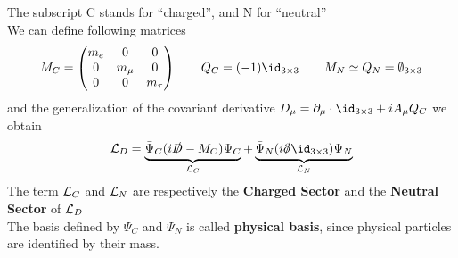 \documentclass[TheoreticalPhy_ModB.tex]{subfiles}
\begin{document}
The subscript C stands for ``charged'', and N for ``neutral''\\
We can define following matrices
\[
M_C =
\begin{pmatrix}
m_e 	& 0 			& 0 \\
0	& m_{\mu}	& 0 \\
0	& 0			& m_{\tau}
\end{pmatrix}
\qquad
Q_C = (-1) \id_{3 \times 3}
\qquad
M_N \simeq Q_N = \emptyset_{3 \times 3}
\]
and the generalization of the covariant derivative $D_{\mu} = \partial_{\mu} \cdot \id_{3 \times 3} + iA_{\mu}Q_C$ we obtain
\[
\mathL_D = \underbrace{\bar{\Psi}_C (i \slashed D - M_C)\Psi_C}_{\mathL_C} +
	\underbrace{\bar{\Psi}_N(i \slashed \partial \id_{3 \times 3})\Psi_N}_{\mathL_N}
\]
The term $\mathcal{L}_C$ and $\mathcal{L}_N$ are respectively the \textbf{Charged Sector} and the \textbf{Neutral Sector} of $\mathcal{L}_D$\\
The basis defined by $\Psi_C$ and $\Psi_N$ is called \textbf{physical basis}, since physical particles are identified by their mass.
\end{document}
